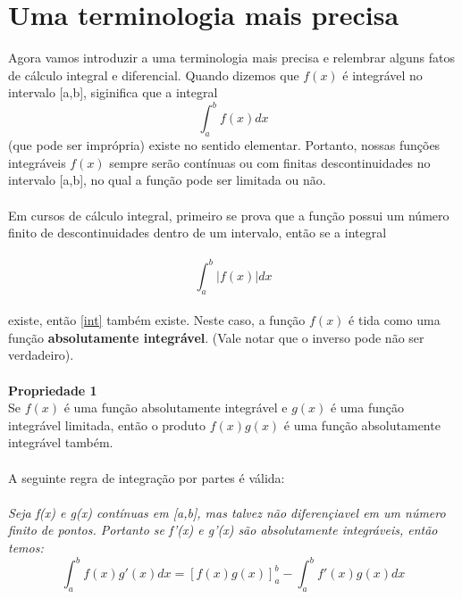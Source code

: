 \documentclass{article}
\begin{document}
\section{ Uma terminologia mais precisa}
Agora vamos introduzir a uma terminologia mais precisa e relembrar alguns fatos
de cálculo integral e diferencial. Quando dizemos que $f(x)$ é integrável no 
intervalo [a,b], siginifica que a integral\\
\begin{equation}
\label{int}
    \int_{a}^{b}f(x)dx 
\end{equation}
(que pode ser imprópria) existe no sentido elementar. Portanto, nossas funções 
integráveis $f(x)$ sempre serão contínuas ou com finitas descontinuidades no 
intervalo [a,b], no qual a função pode ser limitada ou não.\\
\\
Em cursos de cálculo integral, primeiro se prova que a função possui um número
finito de descontinuidades dentro de um intervalo, então se a integral\\
\\
\begin{equation}
    \int_{a}^{b}|f(x)|dx 
\end{equation} 
\\
existe, então \ref{int} também existe. Neste caso, a função $f(x)$ é tida como
uma função \textbf{absolutamente integrável}. (Vale notar que o inverso pode não
ser verdadeiro).\\
\\
\textbf{Propriedade 1}\\
Se $f(x)$ é uma função absolutamente integrável e $g(x)$ é uma função integrável
limitada, então o produto $f(x)g(x)$ é uma função absolutamente integrável também.
\\
\\
A seguinte regra de integração por partes é válida:\\
\\
\textit{Seja f(x) e g(x) contínuas em [a,b], mas talvez não diferençiavel
em um número finito de pontos. Portanto se f'(x) e g'(x) são absolutamente 
integráveis, então temos:}\\
\begin{equation}
    \int_{a}^{b}f(x)g'(x) dx = [f(x)g(x)]_{a}^{b} - \int_{a}^{b}f'(x)g(x) dx
\end{equation}
\end{document}
